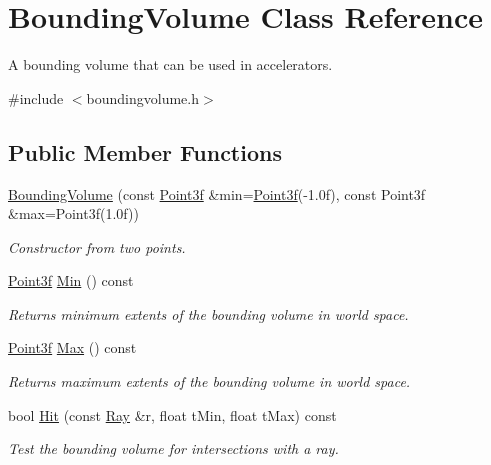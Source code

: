 \hypertarget{class_bounding_volume}{}\section{Bounding\+Volume Class Reference}
\label{class_bounding_volume}


A bounding volume that can be used in accelerators.  




{\ttfamily \#include $<$boundingvolume.\+h$>$}

\subsection*{Public Member Functions}
\begin{DoxyCompactItemize}
\item 
\mbox{\hyperlink{class_bounding_volume_a08c918227002a6c6d08548a8e9e02cd7}{Bounding\+Volume}} (const \mbox{\hyperlink{class_point}{Point3f}} \&min=\mbox{\hyperlink{class_point}{Point3f}}(-\/1.\+0f), const Point3f \&max=\+Point3f(1.\+0f))
\begin{DoxyCompactList}\small\item\em Constructor from two points. \end{DoxyCompactList}\item 
\mbox{\hyperlink{class_point}{Point3f}} \mbox{\hyperlink{class_bounding_volume_a643e53cdb0b33ea40a0989126c059fdf}{Min}} () const
\begin{DoxyCompactList}\small\item\em Returns minimum extents of the bounding volume in world space. \end{DoxyCompactList}\item 
\mbox{\hyperlink{class_point}{Point3f}} \mbox{\hyperlink{class_bounding_volume_ae050af61a5b66a754bf2bed04f9e3078}{Max}} () const
\begin{DoxyCompactList}\small\item\em Returns maximum extents of the bounding volume in world space. \end{DoxyCompactList}\item 
bool \mbox{\hyperlink{class_bounding_volume_a257cd7e43d376fe2cf19208046bfb248}{Hit}} (const \mbox{\hyperlink{class_ray}{Ray}} \&r, float t\+Min, float t\+Max) const
\begin{DoxyCompactList}\small\item\em Test the bounding volume for intersections with a ray. \end{DoxyCompactList}\end{DoxyCompactItemize}
